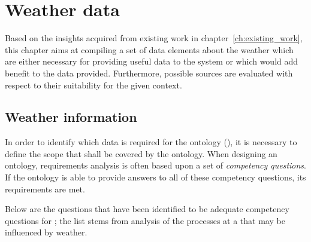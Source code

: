 \chapter{Weather data}
\label{ch:weather_data}

Based on the insights acquired from existing work in chapter~\ref{ch:existing_work}, this chapter aims at compiling a set of data elements about the weather which are either necessary for providing useful data to the \thinkhome system or which would add benefit to the data provided. Furthermore, possible sources are evaluated with respect to their suitability for the given context.

\section{Weather information}
\label{sec:weather_information}

In order to identify which data is required for the \thinkhome ontology (\thinkhomeweather), it is necessary to define the scope that shall be covered by the ontology. When designing an ontology, requirements analysis is often based upon a set of \emph{competency questions}. If the ontology is able to provide answers to all of these competency questions, its requirements are met.

Below are the questions that have been identified to be adequate competency questions for \thinkhomeweather; the list stems from analysis of the processes at a \smarthome that may be influenced by weather.

